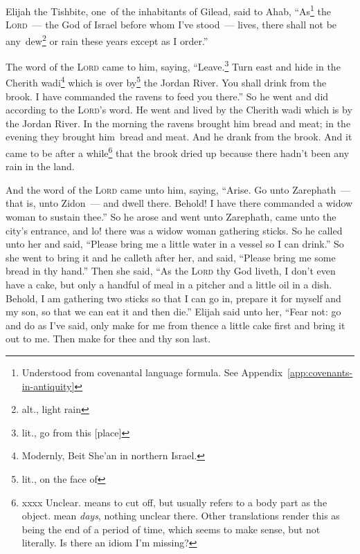 
\begin{inparaenum}
     Elijah the Tishbite, one\understood\ of the inhabitants of Gilead, said to Ahab, ``As\footnote{Understood from covenantal language formula. See Appendix~\ref{app:covenants-in-antiquity}} the \textsc{Lord}~--- the God of Israel before whom I've stood~--- lives, there shall not be any\understood\ dew\footnote{alt., light rain} or rain these years except as I order.''%
    
     The word of the \textsc{Lord} came to him, saying,%
     ``Leave.\footnote{lit., go from this [place]} Turn east and hide in the Cherith wadi\footnote{Modernly, Beit She'an in northern Israel.} which is over by\footnote{lit., on the face of} the Jordan River.\understood%
     You shall drink from the brook. I have commanded the ravens to feed you there.''%
     So he went and did according to the \textsc{Lord}'s word. He went and lived by the Cherith wadi which is by the Jordan River.%
     In the morning the ravens brought him bread and meat; in the evening they brought him\understood\ bread and meat. And he drank from the brook.%
     And it came to be after a while\footnote{xxxx Unclear.  means to cut off, but usually refers to a body part as the object.  mean \textit{days}, nothing unclear there. Other translations render this as being the end of a period of time, which seems to make sense, but not literally. Is there an idiom I'm missing?} that the brook dried up because there hadn't been any rain in the land.%
    
     And the word of the \textsc{Lord} came unto him, saying,%
     ``Arise. Go unto Zarephath~--- that is, unto Zidon~--- and dwell there. Behold! I have there commanded a widow woman to sustain thee.''%
     So he arose and went unto Zarephath, came unto the city's entrance, and lo! there was a widow woman gathering sticks. So he called unto her and said, ``Please bring me a little water in a vessel so I can drink.''%
     So she went to bring it and he calleth after her, and said, ``Please bring me some bread in thy hand.''%
     Then she said, ``As the \textsc{Lord} thy God liveth, I don't even have a cake, but only a handful of meal in a pitcher and a little oil in a dish. Behold, I am gathering two sticks so that I can go in, prepare it for myself and my son, so that we can eat it and then die.''%
     Elijah said unto her, ``Fear not: go and do as I've said, only make for me from thence a little cake first and bring it out to me. Then make for thee and thy son last.%
    

\end{inparaenum}
